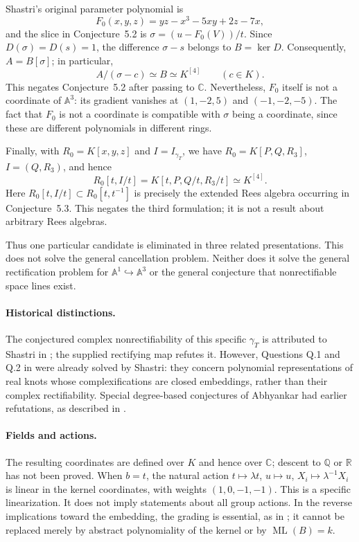 Shastri's original parameter polynomial is
\[
F_0(x,y,z)=yz-x^3-5xy+2z-7x,
\]
and the slice in Conjecture~5.2 is
$\sigma=(u-F_0(V))/t$. Since $D(\sigma)=D(s)=1$,
the difference $\sigma-s$ belongs to $B=\ker D$.
Consequently, $A=B[\sigma]$; in particular,
\[
A/(\sigma-c)\simeq B\simeq K^{[4]}\qquad(c\in K).
\]
This negates Conjecture~5.2 after passing to $\mathbb C$.
Nevertheless, $F_0$ itself is not a coordinate of $\mathbb A^3$:
its gradient vanishes at $(1,-2,5)$ and $(-1,-2,-5)$.
The fact that $F_0$ is not a coordinate is compatible with $\sigma$ being
a coordinate, since these are different polynomials in different rings.

Finally, with $R_0=K[x,y,z]$ and $I=I_{\gamma_T}$, we have
$R_0=K[P,Q,R_3]$, $I=(Q,R_3)$, and hence
\[
R_0[t,I/t]=K[t,P,Q/t,R_3/t]\simeq K^{[4]}.
\]
Here $R_0[t,I/t]\subset R_0[t,t^{-1}]$ is precisely the extended
Rees algebra occurring in Conjecture~5.3. This negates the third
formulation; it is not a result about arbitrary Rees algebras.

Thus one particular candidate is eliminated in three related presentations.
This does not solve the general cancellation problem. Neither does it solve
the general rectification problem for $\mathbb A^1\hookrightarrow
\mathbb A^3$ or the general conjecture that nonrectifiable space lines exist.

\paragraph{Historical distinctions.}
The conjectured complex nonrectifiability of this specific $\gamma_T$
is attributed to Shastri in \cite[p.~1319]{vdER}; the supplied rectifying
map refutes it. However, Questions Q.1 and Q.2 in
\cite[p.~12]{Shastri} were already solved by Shastri: they concern
polynomial representations of real knots whose complexifications are
closed embeddings, rather than their complex rectifiability.
Special degree-based conjectures of Abhyankar had earlier refutations,
as described in \cite[Introduction, pp.~115--116]{Craighero}.

\paragraph{Fields and actions.}
The resulting coordinates are defined over $K$ and hence over $\mathbb C$;
descent to $\mathbb Q$ or $\mathbb R$ has not been proved.
When $b=t$, the natural action
$t\mapsto\lambda t$, $u\mapsto u$, $X_i\mapsto\lambda^{-1}X_i$
is linear in the kernel coordinates, with weights $(1,0,-1,-1)$.
This is a specific linearization. It does not imply statements about all
group actions. In the reverse implications toward the embedding, the
grading is essential, as in \cite{Masuda}; it cannot be replaced merely
by abstract polynomiality of the kernel or by $\operatorname{ML}(B)=k$.

